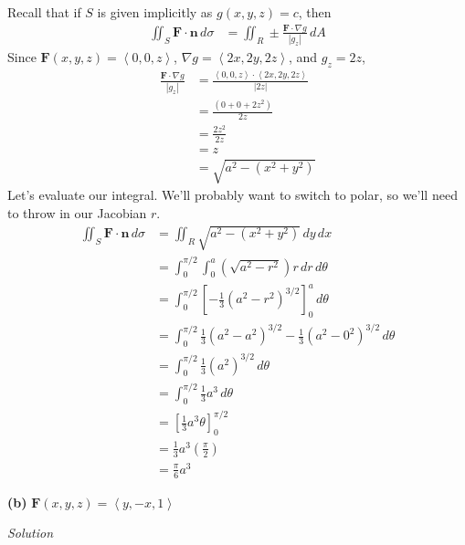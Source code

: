 \documentclass{article}
\newcommand{\lrp}[1]{\left( #1 \right)}
\newcommand{\lra}[1]{\left\langle #1 \right\rangle}
\newcommand{\lrb}[1]{\left[ #1 \right]}
\newcommand{\F}[0]{\mathbf{F}}
\newcommand{\n}[0]{\mathbf{n}}
\newcommand{\Solution}{\textit{Solution}}
\begin{document}
Recall that if $S$ is given implicitly as $g(x,y,z)=c$, then
\begin{align*}
    \iint_S \F\cdot \n \,d\sigma &= \iint_R \pm \frac{\F\cdot \nabla g}{\left|g_z\right|}\,dA
\end{align*}
Since $\F(x,y,z)=\lra{0,0,z}$, $\nabla g = \lra{2x,2y,2z}$, and $g_z=2z$,
\begin{align*}
   \frac{ \F \cdot \nabla g}{\left|g_z\right|}&=\frac{\lra{0,0,z}\cdot \lra{2x,2y,2z}}{\left|2z\right|}\\
   &=\frac{ \lrp{0+0+2z^2}}{2z}\tag{we're in first octant}\\
   &=\frac{2z^2}{2z}\tag{$2z^2\geq 0$}\\
   &=z\\
   &=\sqrt{a^2-(x^2+y^2)}\tag{$x^2+y^2+z^2=a^2\implies z^2=a^2-(x^2+y^2)$}
\end{align*}
Let's evaluate our integral. We'll probably want to switch to polar, so we'll need to throw in our Jacobian $r$.
\begin{align*}
    \iint_S \F\cdot \n \,d\sigma  &=\iint_R \sqrt{a^2 - (x^2+y^2)}\,dy\,dx\\
    &=\int_0^{\pi/2}\int_0^a \lrp{\sqrt{a^2 - r^2}}r\,dr\,d\theta\tag{in polar, $x^2+y^2=r^2$}\\
    &=\int_0^{\pi/2}\lrb{-\frac{1}{3}(a^2-r^2)^{3/2}}_0^a\,d\theta\tag{or do $u$-sub, $u=a^2-r^2$}\\
    &=\int_0^{\pi/2}\frac{1}{3}(a^2-a^2)^{3/2}-\frac{1}{3}(a^2-0^2)^{3/2}\,d\theta\\
    &=\int_0^{\pi/2}\frac{1}{3}(a^2)^{3/2}\,d\theta\\
    &=\int_0^{\pi/2}\frac{1}{3}a^3\,d\theta\\
    &=\lrb{\frac{1}{3}a^3\theta}_0^{\pi/2}\\
    &=\frac{1}{3}a^3\lrp{\frac{\pi}{2}}\\
    &=\boxed{\frac{\pi}{6}a^3}
\end{align*}

{}\textbf{(b)} $\F(x,y,z)=\lra{y,-x,1}$

\Solution
\end{document}
